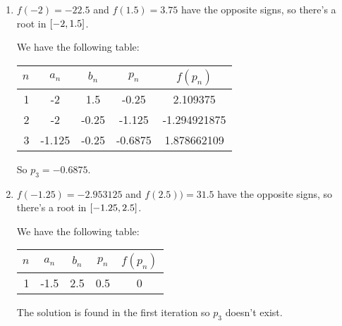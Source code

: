 \documentclass[../../Assignments.tex]{subfiles}
\begin{document}
\begin{solution}
    \begin{enumerate}[label = (\alph*)]
        \item \(f(-2) = \num{-22.5}\) and \(f(\num{1.5}) = \num{3.75}\) have the
            opposite signs, so there's a root in \(\interval{-2}{\num{1.5}}\).

            We have the following table:

            \begin{table}[H]
                \centering
                \begin{tabular}{r S[table-format=-1.3] S[table-format=-1.2] S[table-format=-1.4] S[table-format=-1.9]}
                    \toprule
                    \(n\)  &  {\(a_n\)}  &  {\(b_n\)}  &  {\(p_n\)}  &  {\(f(p_n)\)}  \\
                      &  -2         &   1.5       &  -0.25      &   2.109375     \\
                        2  &  -2         &  -0.25      &  -1.125     &  -1.294921875  \\
                        3  &  -1.125     &  -0.25      &  -0.6875    &   1.878662109  \\
                    \bottomrule
                \end{tabular}
            \end{table}

            So \(p_3 = \num{-0.6875}\).

        \item \(f(\num{-1.25}) = \num{-2.953125}\) and \(f(\num{2.5})) =
            \num{31.5}\) have the opposite signs, so there's a root in
            \(\interval{\num{-1.25}}{\num{2.5}}\).

            We have the following table:

            \begin{table}[H]
                \centering
                \begin{tabular}{r S[table-format=-1.1] S[table-format=-1.1] S[table-format=1.1] S[table-format=1.1]}
                    \toprule
                    \(n\)  &  {\(a_n\)}  &  {\(b_n\)}  &  {\(p_n\)}  &  {\(f(p_n)\)}  \\
                       &  -1.5       &   2.5       &   0.5       &   0            \\
                    \bottomrule
                \end{tabular}
            \end{table}

            The solution is found in the first iteration so \(p_3\) doesn't
            exist.
    \end{enumerate}
\end{solution}
\end{document}

